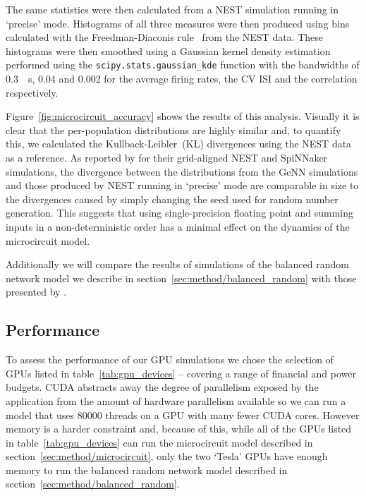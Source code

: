 \documentclass[utf8]{frontiersSCNS} %
\begin{document}
The same statistics were then calculated from a NEST simulation running in `precise' mode.
Histograms of all three measures were then produced using bins calculated with the Freedman-Diaconis rule~\citep{Freedman1981} from the NEST data.
These histograms were then smoothed using a Gaussian kernel density estimation performed using the \lstinline{scipy.stats.gaussian_kde} function with the bandwidths of \SI{0.3}{\per\second}, \num{0.04} and \num{0.002} for the average firing rates, the CV ISI and the correlation respectively.

Figure~\ref{fig:microcircuit_accuracy} shows the results of this analysis.
Visually it is clear that the per-population distributions are highly similar and, to quantify this, we calculated the Kullback-Leibler~(KL) divergences using the NEST data as a reference.
As reported by \citet{VanAlbada2018} for their grid-aligned NEST and SpiNNaker simulations, the divergence between the distributions from the GeNN simulations and those produced by NEST running in `precise' mode are comparable in size to the divergences caused by simply changing the seed used for random number generation.
This suggests that using single-precision floating point and summing inputs in a non-deterministic order has a minimal effect on the dynamics of the microcircuit model.

Additionally we will compare the results of simulations of the balanced random network model we describe in section~\ref{sec:method/balanced_random} with those presented by \citet{Morrison2007}.

\subsection{Performance}
\label{sec:results/performance}
To assess the performance of our GPU simulations we chose the selection of GPUs listed in table~\ref{tab:gpu_devices} -- covering a range of financial and power budgets.
CUDA abstracts away the degree of parallelism exposed by the application from the amount of hardware parallelism available so we can run a model that uses \num{80000} threads on a GPU with many fewer CUDA cores.
However memory is a harder constraint and, because of this, while all of the GPUs listed in table~\ref{tab:gpu_devices} can run the microcircuit model described in section~\ref{sec:method/microcircuit}, only the two `Tesla' GPUs have enough memory to run the balanced random network model described in section~\ref{sec:method/balanced_random}.
\end{document}
